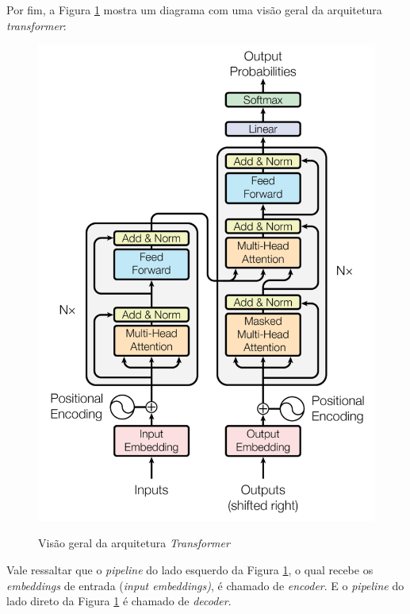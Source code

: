 Por fim, a Figura \ref{fig:transformer-architecture} mostra um diagrama com uma visão geral da arquitetura \textit{transformer}:

\begin{figure}[H]
    \centering
    \caption{Visão geral da arquitetura \textit{Transformer}}
    \includegraphics[scale=0.4]{imagens/conceitos/transformer-architecture.pdf}
    \label{fig:transformer-architecture}
\end{figure}

Vale ressaltar que o \textit{pipeline} do lado esquerdo da Figura \ref{fig:transformer-architecture}, o qual recebe os \textit{embeddings} de entrada (\textit{input embeddings)}, é chamado de \textit{encoder}. E o \textit{pipeline} do lado direto da Figura \ref{fig:transformer-architecture} é chamado de \textit{decoder}.

